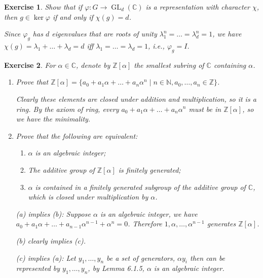\documentclass[11pt]{report}
\theoremstyle{mythm}
\let\oldendproof\endproof
\renewenvironment{proof}[1][\proofname]{%
  \oldproof[\normalfont \bfseries #1]%
}{\oldendproof}
\newtheorem{exercise}{Exercise}[chapter]
\renewcommand*{\proofname}{Proof}
\theoremstyle{myans}
\newcommand{\bbN}{\mathbb N}
\newcommand{\bbZ}{\mathbb Z}
\newcommand{\bbC}{\mathbb C}
\DeclareMathOperator{\GL}{GL}
\begin{document}
\setcounter{exercise}{4}
\begin{exercise}
  Show that if $\varphi\colon G \to \GL_d(\bbC)$ is a representation with character
  $\chi$, then $g \in \ker \varphi$ if and only if $\chi(g) = d$.
  \begin{proof}
    Since $\varphi_g$ has $d$ eigenvalues that are roots of unity $\lambda_1^n = \dots = \lambda_d^n = 1$,
    we have $\chi(g) = \lambda_1 + \dots + \lambda_d = d$ iff $\lambda_1 = \dots = \lambda_d = 1$,
    i.e., $\varphi_g = I$.
  \end{proof}
\end{exercise}

\begin{exercise}
  For $\alpha\in \bbC$, denote by $\bbZ[\alpha]$ the smallest
  subring of $\bbC$ containing $\alpha$.
  \begin{enumerate}
    \item Prove that $\bbZ[\alpha]=\{a_0 +a_1 \alpha+\dots +a_n \alpha^n
    \mid n\in \bbN, a_0,\dots,a_n \in \bbZ \}$.
    \begin{proof}
      Clearly these elements are closed under addition
      and multiplication, so it is a ring. By the axiom of ring, every $a_0 +a_1 \alpha+\dots +a_n \alpha^n$
      must be in $\bbZ[\alpha]$, so we have the minimality.
    \end{proof}
    \item Prove that the following are equivalent:
    \begin{enumerate}
      \item $\alpha$ is an algebraic integer;
      \item The additive group of $\bbZ[\alpha]$ is finitely generated;
      \item $\alpha$ is contained in a finitely generated subgroup of the additive group of $\bbC$,
      which is closed under multiplication by $\alpha$.
    \end{enumerate}
    \begin{proof}
      (a) implies (b): Suppose $\alpha$ is an algebraic integer, we have
      $a_0 + a_1\alpha + \dots + a_{n-1}\alpha^{n-1} + \alpha^n = 0$.
      Therefore $1, \alpha, \dots, \alpha^{n-1}$ generates $\bbZ[\alpha]$.
      
      (b) clearly implies (c).

      (c) implies (a): Let $y_1, \dots, y_n$ be a set of generators, $\alpha y_i$
      then can be represented by $y_1, \dots, y_n$, by Lemma 6.1.5, $\alpha$ is an
      algebraic integer.
    \end{proof}
  \end{enumerate}
\end{exercise}
\end{document}

